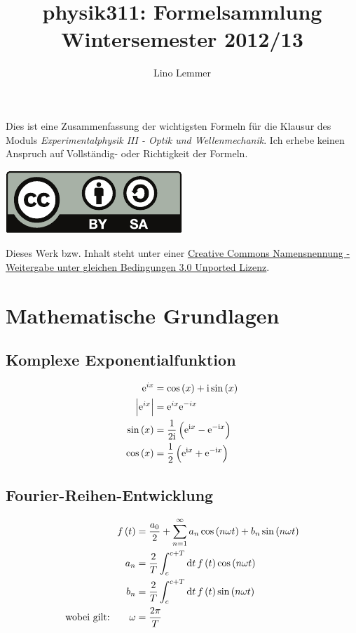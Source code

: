 

\newcommand{\fehlt}{\textbf{\textcolor{red}{Hier fehlt Zeug...}}}

\title{physik311: Formelsammlung\\
	Wintersemester 2012/13}
\author{Lino Lemmer}


\maketitle
	Dies ist eine Zusammenfassung der wichtigsten Formeln für die Klausur des Moduls \emph{Experimentalphysik III - Optik und Wellenmechanik}. Ich erhebe keinen Anspruch auf Vollständig- oder Richtigkeit der Formeln.

	\begin{center}
		\includegraphics[height=5ex]{by-sa.pdf}

		Dieses Werk bzw. Inhalt steht unter einer \href{http://creativecommons.org/licenses/by-sa/3.0/deed.de}{Creative Commons Namensnennung - Weitergabe unter gleichen Bedingungen 3.0 Unported Lizenz}.
	\end{center}


	\section{Mathematische Grundlagen}
		\subsection{Komplexe Exponentialfunktion}
			\begin{align*}
				\exp{ix}&=\cos\del{x}+\i\sin\del{x}\\
				\abs{\exp{ix}}&=\exp{ix}\exp{-ix}\\
				\sin\del x&=\frac{1}{2\i}\del{\exp{\i x}-\exp{-\i x}}\\
				\cos\del x&=\half\del{\exp{\i x}+\exp{-\i x}}
			\end{align*}

		\subsection{Fourier-Reihen-Entwicklung}
			\begin{align*}
				f\del{t}&=\frac{a_0}{2}+\sum_{n=1}^\infty a_n\cos\del{n\omega t}+b_n\sin\del{n\omega t}\\
				a_n&=\frac{2}{T}\int_c^{c+T}\dif t \, f\del{t}\cos\del{n\omega t}\\
				b_n&=\frac{2}{T}\int_c^{c+T}\dif t \, f\del{t}\sin\del{n\omega t}\\
				\text{wobei gilt:}\qquad\omega&=\frac{2\pi}{T}
			\end{align*}

